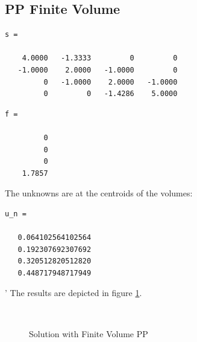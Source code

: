 \documentclass[a4paper,12pt]{article}
\begin{document}
\subsection{PP Finite Volume}
\begin{verbatim}
s =

    4.0000   -1.3333         0         0
   -1.0000    2.0000   -1.0000         0
         0   -1.0000    2.0000   -1.0000
         0         0   -1.4286    5.0000
\end{verbatim}
\begin{verbatim}
f =

         0
         0
         0
    1.7857
\end{verbatim}
The unknowns are at the centroids of the volumes:
\begin{verbatim}
u_n =

   0.064102564102564
   0.192307692307692
   0.320512820512820
   0.448717948717949
\end{verbatim}'
The results are depicted in figure \ref{fig:studyfiniteVolPP}.
\begin{figure} 
\centering
{}\\
\caption{Solution with Finite Volume PP}\label{fig:studyfiniteVolPP}
\end{figure}
\end{document}
